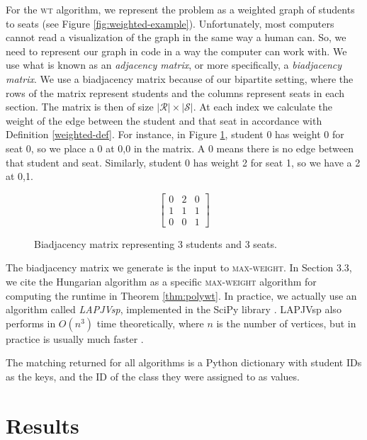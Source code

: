 For the \textsc{wt} algorithm, we represent the problem as a weighted graph of
students to seats  (see Figure \ref{fig:weighted-example}). Unfortunately,
most computers cannot read a visualization of the graph in the same way a human
can. So, we need to represent our graph in code in a way the computer can
work with. We use what is known as an \textit{adjacency matrix}, or more
specifically, a \textit{biadjacency matrix}. We use a biadjacency matrix because
of our bipartite setting, where the rows of the matrix represent students and
the columns represent seats in each section. The matrix is then of size
$|\mathcal{R}| \times |\mathcal{S}|$. At each
index we calculate the weight of the edge between the student and that seat in
accordance with Definition \ref{weighted-def}. For instance, in
Figure \ref{fig:adj_matrix}, student 0 has weight 0 for seat 0, so we place a 0
at 0,0 in the matrix. A 0 means there is no edge between that student and seat.
Similarly, student 0 has weight 2 for seat 1, so we have a 2 at 0,1.

\begin{figure}[h]
  \centering
  \begin{equation*}
    \begin{bmatrix}
      0 & 2 & 0 \\
      1 & 1 & 1 \\
      0 & 0 & 1
    \end{bmatrix}
  \end{equation*}
  \caption{Biadjacency matrix representing 3 students and 3 seats.}
  \label{fig:adj_matrix}
\end{figure}

The biadjacency matrix we generate is the input to \textsc{max-weight}. In Section
3.3, we cite the Hungarian algorithm \cite{hungarian} as a specific
\textsc{max-weight} algorithm for computing the runtime in Theorem
\ref{thm:polywt}. In practice, we actually use an algorithm called
\textit{LAPJVsp}, implemented in the SciPy library \cite{scipy}. LAPJVsp also
performs in $O(n^3)$ time theoretically, where $n$ is the number of vertices,
but in practice is usually much faster \cite{Jonker}. 

The matching returned for all algorithms is a Python dictionary with student IDs as the keys, and the ID of the class they were assigned to as values.

\section{Results}

